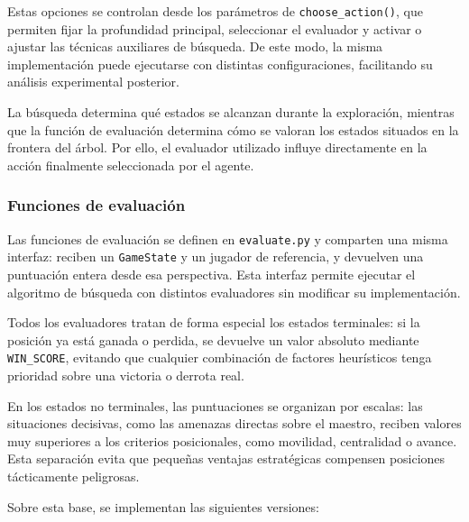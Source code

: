 Estas opciones se controlan desde los parámetros de \texttt{choose\_action()}, que permiten fijar la profundidad principal, seleccionar el evaluador y activar o ajustar las técnicas auxiliares de búsqueda. De este modo, la misma implementación puede ejecutarse con distintas configuraciones, facilitando su análisis experimental posterior.

La búsqueda determina qué estados se alcanzan durante la exploración, mientras que la función de evaluación determina cómo se valoran los estados situados en la frontera del árbol. Por ello, el evaluador utilizado influye directamente en la acción finalmente seleccionada por el agente.

\subsubsection{Funciones de evaluación}

Las funciones de evaluación se definen en \texttt{evaluate.py} y comparten una misma interfaz: reciben un \texttt{GameState} y un jugador de referencia, y devuelven una puntuación entera desde esa perspectiva. Esta interfaz permite ejecutar el algoritmo de búsqueda con distintos evaluadores sin modificar su implementación.

Todos los evaluadores tratan de forma especial los estados terminales: si la posición ya está ganada o perdida, se devuelve un valor absoluto mediante \texttt{WIN\_SCORE}, evitando que cualquier combinación de factores heurísticos tenga prioridad sobre una victoria o derrota real.

En los estados no terminales, las puntuaciones se organizan por escalas: las situaciones decisivas, como las amenazas directas sobre el maestro, reciben valores muy superiores a los criterios posicionales, como movilidad, centralidad o avance. Esta separación evita que pequeñas ventajas estratégicas compensen posiciones tácticamente peligrosas.

Sobre esta base, se implementan las siguientes versiones:

